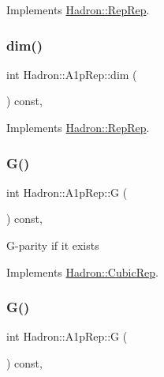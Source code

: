 Implements \mbox{\hyperlink{structHadron_1_1RepRep_a92c8802e5ed7afd7da43ccfd5b7cd92b}{Hadron\+::\+Rep\+Rep}}.

\mbox{\label{structHadron_1_1A1pRep_a79006cfd063396120fffa57b1280949e}} 
\subsubsection{\texorpdfstring{dim()}{dim()}\hspace{0.1cm}{\footnotesize\ttfamily [3/3]}}
{\footnotesize\ttfamily int Hadron\+::\+A1p\+Rep\+::dim (\begin{DoxyParamCaption}{ }\end{DoxyParamCaption}) const\hspace{0.3cm}{\ttfamily [inline]}, {\ttfamily [virtual]}}



Implements \mbox{\hyperlink{structHadron_1_1RepRep_a92c8802e5ed7afd7da43ccfd5b7cd92b}{Hadron\+::\+Rep\+Rep}}.

\mbox{\label{structHadron_1_1A1pRep_a4c6060ff01284b47d0ce71d5094b3e28}} 
\subsubsection{\texorpdfstring{G()}{G()}\hspace{0.1cm}{\footnotesize\ttfamily [1/2]}}
{\footnotesize\ttfamily int Hadron\+::\+A1p\+Rep\+::G (\begin{DoxyParamCaption}{ }\end{DoxyParamCaption}) const\hspace{0.3cm}{\ttfamily [inline]}, {\ttfamily [virtual]}}

G-\/parity if it exists 

Implements \mbox{\hyperlink{structHadron_1_1CubicRep_a52104e43266d1614c00bbd1c3b395458}{Hadron\+::\+Cubic\+Rep}}.

\mbox{\label{structHadron_1_1A1pRep_a4c6060ff01284b47d0ce71d5094b3e28}} 
\subsubsection{\texorpdfstring{G()}{G()}\hspace{0.1cm}{\footnotesize\ttfamily [2/2]}}
{\footnotesize\ttfamily int Hadron\+::\+A1p\+Rep\+::G (\begin{DoxyParamCaption}{ }\end{DoxyParamCaption}) const\hspace{0.3cm}{\ttfamily [inline]}, {\ttfamily [virtual]}}

